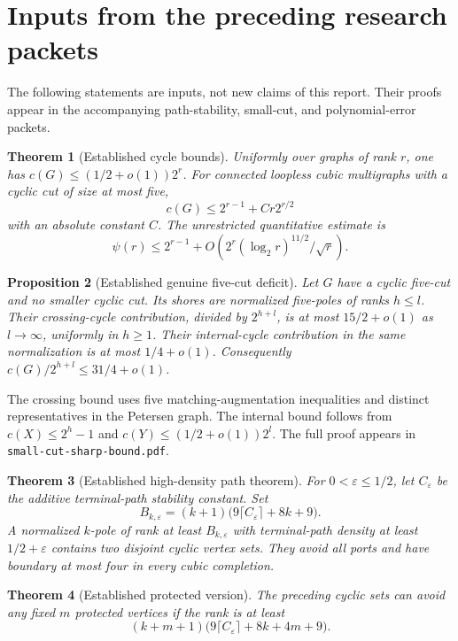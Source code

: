 \documentclass[11pt]{article}
\newtheorem{theorem}{Theorem}[section]
\newtheorem{proposition}[theorem]{Proposition}
\begin{document}
\section{Inputs from the preceding research packets}
The following statements are inputs, not new claims of this report.
Their proofs appear in the accompanying path-stability, small-cut, and polynomial-error packets.

\begin{theorem}[Established cycle bounds]\label{thm:sharp-order-five-cut-error}
Uniformly over graphs of rank $r$, one has $c(G)\le(1/2+o(1))2^r$.
For connected loopless cubic multigraphs with a cyclic cut of size at most five,
\[
 c(G)\le2^{r-1}+C r2^{r/2}
\]
with an absolute constant $C$.
The unrestricted quantitative estimate is
\[
 \psi(r)\le2^{r-1}+O\!\left(2^r(\log_2r)^{11/2}/\sqrt r\right).
\]
\end{theorem}

\begin{proposition}[Established genuine five-cut deficit]\label{prop:five-cut-universal-deficit}
Let $G$ have a cyclic five-cut and no smaller cyclic cut.
Its shores are normalized five-poles of ranks $h\le l$.
Their crossing-cycle contribution, divided by $2^{h+l}$, is at most $15/2+o(1)$ as $l\to\infty$, uniformly in $h\ge1$.
Their internal-cycle contribution in the same normalization is at most $1/4+o(1)$.
Consequently $c(G)/2^{h+l}\le31/4+o(1)$.
\end{proposition}

The crossing bound uses five matching-augmentation inequalities and distinct representatives in the Petersen graph.
The internal bound follows from $c(X)\le2^h-1$ and $c(Y)\le(1/2+o(1))2^l$.
The full proof appears in \nolinkurl{small-cut-sharp-bound.pdf}.

\begin{theorem}[Established high-density path theorem]\label{thm:high-density-pair-small-cyclic-cut}
For $0<\varepsilon\le1/2$, let $C_\varepsilon$ be the additive terminal-path stability constant.
Set
\[
 B_{k,\varepsilon}=(k+1)\bigl(9\lceil C_\varepsilon\rceil+8k+9\bigr).
\]
A normalized $k$-pole of rank at least $B_{k,\varepsilon}$ with terminal-path density at least $1/2+\varepsilon$ contains two disjoint cyclic vertex sets.
They avoid all ports and have boundary at most four in every cubic completion.
\end{theorem}

\begin{theorem}[Established protected version]\label{thm:high-density-protected-cyclic-sets}
The preceding cyclic sets can avoid any fixed $m$ protected vertices if the rank is at least
\[
 (k+m+1)\bigl(9\lceil C_\varepsilon\rceil+8k+4m+9\bigr).
\]
\end{theorem}
\end{document}

